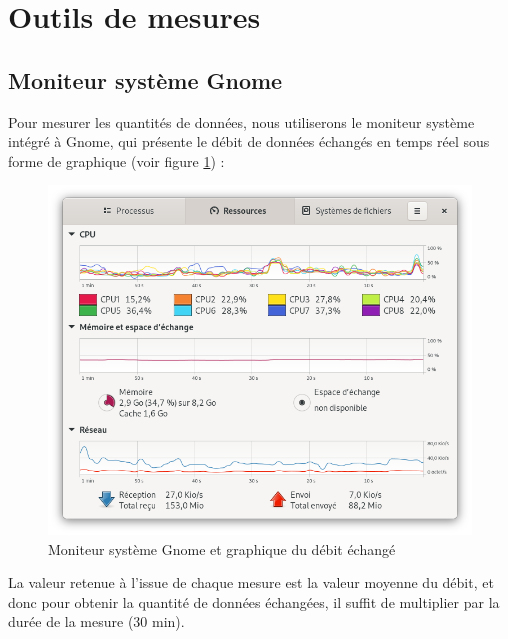 \documentclass[11pt,a4paper]{report}
\begin{document}
\section{Outils de mesures}

\subsection{Moniteur système Gnome}
Pour mesurer les quantités de données, nous utiliserons le moniteur système intégré à Gnome, qui présente le débit de données échangés en temps réel sous forme de graphique (voir figure \ref{fig:gnome}) :

\begin{figure}[!h]
    \centering
    \includegraphics[scale=0.3]{capture_moniteur_sys.png}
    \caption{Moniteur système Gnome et graphique du débit échangé}
     \label{fig:gnome}
\end{figure}

La valeur retenue à l'issue de chaque mesure est la valeur moyenne du débit, et donc pour obtenir la quantité de données échangées, il suffit de multiplier par la durée de la mesure (30 min).
\end{document}
